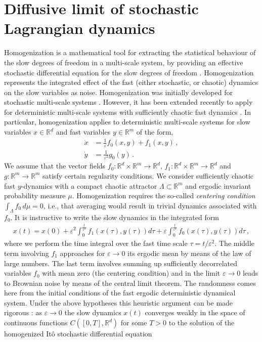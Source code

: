 \documentclass[12pt,onesided]{article}
\def\eps{\varepsilon}
\newcommand{\difft}{d}
\newcommand{\R}{\mathbb{R}}
\begin{document}
\section{Diffusive limit of stochastic Lagrangian dynamics}
\label{sec.homo}
Homogenization is a mathematical tool for extracting the statistical behaviour of the slow degrees of freedom in a multi-scale system, by providing an effective stochastic differential equation for the slow degrees of freedom \cite{Givonetal04,PavliotisStuart}. Homogenization represents the integrated effect of the fast (either stochastic, or chaotic) dynamics on the slow variables as noise. Homogenization was initially developed for stochastic multi-scale systems \cite{Khasminsky66,Kurtz73,Papanicolaou76}. However, it has been extended recently to apply for deterministic multi-scale systems with sufficiently chaotic fast dynamics \cite{MelbourneStuart11,GottwaldMelbourne13c,KellyMelbourne17}.
In particular, homogenization applies to deterministic multi-scale systems for slow variables $x\in\R^d$ and fast variables $y\in \R^m$ of the form,
\begin{align}
\dot x &=\frac{1}{\eps}f_0(x,y) + f_1(x,y)
\,,\label{e.homo1}
\\
\dot y &= \frac{1}{\eps^2}g_0(y)\, .
\label{e.homo2}
\end{align}
We assume that the vector fields $f_0:\R^d\times\R^m\to\R^d$, $f_1:\R^d\times\R^m\to\R^d$ and $g:\R^m\to\R^m$ satisfy certain regularity conditions. We consider sufficiently chaotic fast $y$-dynamics with a compact chaotic attractor $\Lambda\subset\R^m$ and ergodic invariant probability measure $\mu$. Homogenization requires the so-called {\em{centering condition}} $\int_\Lambda f_0\,d\mu=0$, i.e., that averaging would result in trivial dynamics associated with $f_0$. It is instructive to write the slow dynamics in the integrated form
\begin{align}
x(t) = x(0) + \eps^2 \int_0^{\frac{t}{\eps^2}}f_1(x(\tau),y(\tau)) \difft\tau + \eps\int_0^{\frac{t}{\eps^2}}f_0(x(\tau),y(\tau)) \difft\tau\, ,
\end{align}
where we perform the time integral over the fast time scale $\tau = t/\eps^2$. The middle term involving $f_1$ approaches for $\eps \to 0$ its ergodic mean by means of the law of large numbers. The last term involves summing up sufficiently decorrelated variables $f_0$ with mean zero (the centering condition) and in the limit $\eps \to 0$ leads to Brownian noise by means of the central limit theorem. The randomness comes here from the initial conditions of the fast ergodic deterministic dynamical system. Under the above hypotheses this heuristic argument can be made rigorous \cite{MelbourneStuart11,GottwaldMelbourne13c,KellyMelbourne17}: as $\eps\to 0$ the slow dynamics $x(t)$ converges weakly in the space of continuous functions $C([0,T],\R^d)$ for some $T>0$ to the solution of the homogenized It\^o stochastic differential equation
\end{document}
